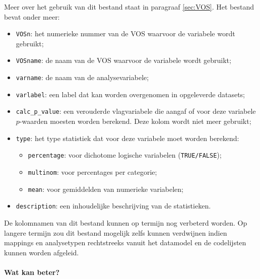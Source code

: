 \documentclass{VSAnote}
\begin{document}
\begin{itemize}
Meer over het gebruik van dit bestand staat in paragraaf \ref{sec:VOS}. Het bestand bevat onder meer:
\begin{itemize}
\item \verb+VOSn+: het numerieke nummer van de VOS waarvoor de variabele wordt gebruikt;
\item \verb+VOSname+: de naam van de VOS waarvoor de variabele wordt gebruikt;
\item \verb+varname+: de naam van de analysevariabele;
\item \verb+varlabel+: een label dat kan worden overgenomen in opgeleverde datasets;
\item \verb+calc_p_value+: een verouderde vlagvariabele die aangaf of voor deze variabele $p$-waarden moesten worden berekend. Deze kolom wordt niet meer gebruikt;
\item \verb+type+: het type statistiek dat voor deze variabele moet worden berekend:
\begin{itemize}
\item \verb+percentage+: voor dichotome logische variabelen (\verb+TRUE/FALSE+);
\item \verb+multinom+: voor percentages per categorie;
\item \verb+mean+: voor gemiddelden van numerieke variabelen;
\end{itemize}
\item \verb+description+: een inhoudelijke beschrijving van de statistieken.
\end{itemize}

De kolomnamen van dit bestand kunnen op termijn nog verbeterd worden. Op langere termijn zou dit bestand mogelijk zelfs kunnen verdwijnen indien mappings en analysetypen rechtstreeks vanuit het datamodel en de codelijsten kunnen worden afgeleid.

\end{itemize}


\paragraph{Wat kan beter?}
\end{document}
